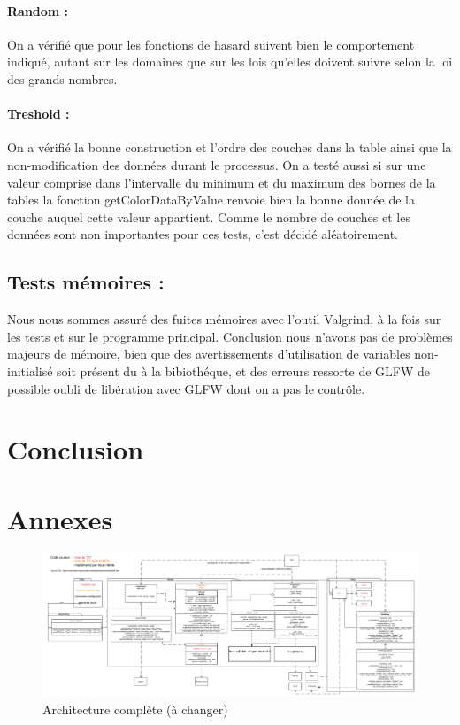 \documentclass[a4paper]{article}
\begin{document}
\paragraph{Random : } On a vérifié que pour les fonctions de hasard suivent bien le comportement indiqué, autant sur les domaines que sur les lois qu'elles doivent suivre selon la loi des grands nombres.

\paragraph{Treshold : } On a vérifié la bonne construction et l'ordre des couches dans la table ainsi que la non-modification des données durant le processus. 
On a testé aussi si sur une valeur comprise dans l'intervalle du minimum et du maximum des bornes de la tables la fonction getColorDataByValue renvoie bien la bonne donnée de la couche auquel cette valeur appartient.
Comme le nombre de couches et les données sont non importantes pour ces tests, c'est décidé aléatoirement.

\subsection{Tests mémoires : }

Nous nous sommes assuré des fuites mémoires avec l'outil Valgrind, à la fois sur les tests et sur le programme principal.
Conclusion nous n'avons pas de problèmes majeurs de mémoire, bien que des avertissements d'utilisation de variables non-initialisé soit présent du à la bibiothéque, et des erreurs ressorte de GLFW de possible oubli de libération avec GLFW dont on a pas le contrôle.

\section{Conclusion}

\section{Annexes}

\begin{figure}[!h]
    \begin{center}
        \includegraphics[width=1.5\linewidth, angle=90]{img/Architecture_complete.png} 
        \caption{Architecture complète (à changer)}
        \label{archiComplete}
    \end{center}
\end{figure}

\newpage


\end{document}
